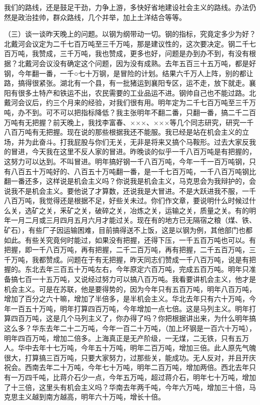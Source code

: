 我们的路线，还是鼓足干劲，力争上游，多快好省地建设社会主义的路线。办法仍然是政治挂帅，群众路线，几个并举，加上土洋结合等等。

（三）谈一谈昨天晚上的问题。以钢为纲带动一切。钢的指标，究竟定多少为好？北戴河会议定为二千七百万吨至三千万吨，那是建议性的，这次要决定。钢二千七百万吨，我赞成，三千万吨，我也赞成，更多也好，问题是办到办不到，有没有根据？北戴河会议没有确定这个问题，因为没有成熟。去年五百三十五万吨，都是好钢，今年翻一番，一千○七十万钢，是冒险的计划。结果六千万人上阵，别的都让路，搞得很紧张。湖北有一个县，有一批猪运到襄阳专区，运不走，放下就走。襄阳有很多土特产和铁运不出，农民需要的工业品运不进。钢帅自己也不能过路。北戴河会议后，约三个月来的经验，对我们很有用。明年定为二千七百万吨至三千万吨，办不到。可不可以把指标降低？我主张明年不翻二番，只翻一番，搞二千二百万吨有无把握？前天晚上，我找李富春、×××、×××等几个同志研究，研究一千八百万吨有无把握。现在说的那些根据我还不能服。我已经是站在机会主义的立场，并为此奋斗。打我屁股与你们无关，无非是将来又搞个马鞍形。过去大家反我的冒进，今天我在这里不反人家的冒进。昨晚谈的似乎一千八百万吨是有把握的，这努力可以达到。不叫冒进。明年搞好钢一千八百万吨，今年一千一百万吨钢，只有八百五十万吨好的、八百五十万吨翻一番，是一千七百万吨，一千八百万吨钢比翻一番还多，这样说是机会主义吗？你说我是机会主义，马克思会为我辩护的，会说我不是机会主义。要他说了才算数，还说我是大冒进。不是大跃进我不服，一千八百万吨，我觉得还是根据不足，好些关未过。你们作文章，要说明什么时候过什么关，选矿之关，釆矿之关，破碎之关，冶炼之关，运输之关，质量之关。有的明年一月二月或三月四月五月六月才能过关。现在有的地方已无隔宿之粮（煤、铁、矿石），有些厂子因运输困难，目前搞得送不上饭，这是以钢为例，其他部门也都如此。有些关究竟何时能过，如果没有把握，还得下压，一千五百万吨也可以。有把握，即一千八百万吨，再有把握，二千二百万吨，再有把握，二千五百万吨，三千万吨，我都赞成。问题在于有无把握，昨天同志们赞成一千八百万吨，说是有把握的。东北去年三百五十万吨左右，今年原定六百万吨，完成五百万吨。明年只准备搞七百一十五万吨，又说经过努力可以搞八百万吨。我看要讲机会主义，他才是机会主义。可是在苏联，他是要得势的，因为今年只有五百万吨，明年八百万吨，增加了百分之六十嘛，增加了半倍多，是半机会主义。华北去年只有六十万吨，今年一百五十万吨，明年打算四百万吨，今年增加一点七倍。这是马列主义。明年打算四百万吨，这是几个马列主义了，你办得了吗？你把根据讲出来，为什么明年搞这么多？华东去年二十二万吨，今年一百二十万吨，（加上坏钢是一百六十万吨），明年四百万吨，增加二倍多。上海真正是无产阶级，一无煤，二无铁，只有五万人。华中去年十七万吨，今年五十万吨，明年二百万吨，增加三倍。此人原先气魄很大，打算搞三百万吨，只要大家努力，过那些关，能成功。无人反对，并且开庆祝会。西南去年二十万吨，今年七十万吨，明年二百万吨，增加两倍。西北去年只有一万四千吨，比蒋介石少一点，今年五万吨，超过蒋介石，明年七十万吨，增加了十三倍，这里头有机会主义吗？华南去年两千吨，今年六万吨，增加三十倍，马克思主义越到南方越高，明年六十万吨，增长十倍。

